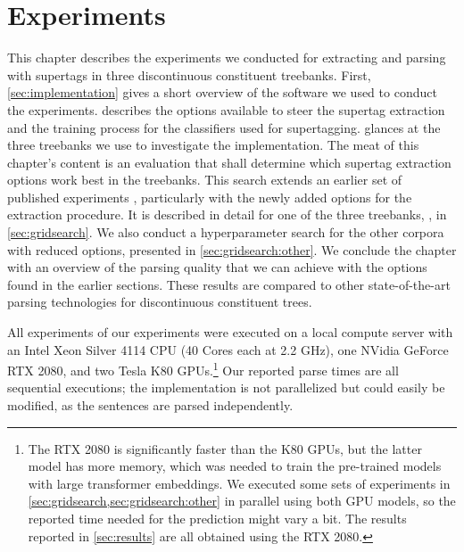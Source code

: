 \documentclass[../document.tex]{subfiles}
\begin{document}
    \chapter{Experiments}\label{sec:experiments}
    This chapter describes the experiments we conducted for extracting and parsing with supertags in three discontinuous constituent treebanks.
    First, \cref{sec:implementation} gives a short overview of the software we used to conduct the experiments.
     describes the options available to steer the supertag extraction and the training process for the classifiers used for supertagging.
     glances at the three treebanks we use to investigate the implementation.
    The meat of this chapter's content is an evaluation that shall determine which supertag extraction options work best in the treebanks.
    This search extends an earlier set of published experiments \citep{Rup22}, particularly with the newly added options for the extraction procedure.
    It is described in detail for one of the three treebanks, \negra{}, in \cref{sec:gridsearch}.
    We also conduct a hyperparameter search for the other corpora with reduced options, presented in \cref{sec:gridsearch:other}.
    We conclude the chapter with an overview of the parsing quality that we can achieve with the options found in the earlier sections.
    These results are compared to other state-of-the-art parsing technologies for discontinuous constituent trees.

    All experiments of our experiments were executed on a local compute server with an Intel Xeon Silver 4114 CPU (40 Cores each at 2.2 GHz), one NVidia GeForce RTX 2080, and two Tesla K80 GPUs.\footnote{
        The RTX 2080 is significantly faster than the K80 GPUs, but the latter model has more memory, which was needed to train the pre-trained models with large transformer embeddings.
        We executed some sets of experiments in \cref{sec:gridsearch,sec:gridsearch:other} in parallel using both GPU models, so the reported time needed for the prediction might vary a bit.
        The results reported in \cref{sec:results} are all obtained using the RTX 2080.
    }
    Our reported parse times are all sequential executions; the implementation is not parallelized but could easily be modified, as the sentences are parsed independently.

    
    
    
    
    
    

    \ifSubfilesClassLoaded{%
        \printindex
    }{}
\end{document}
